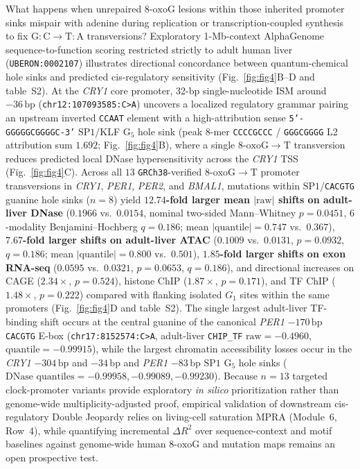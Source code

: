 \documentclass[10pt,letterpaper]{article}
\theoremstyle{plain}
\theoremstyle{definition}
\newcommand{\oxog}{\text{8-oxoG}}
\begin{document}
What happens when unrepaired $\oxog$ lesions within those inherited promoter sinks mispair with adenine during replication or transcription-coupled synthesis to fix $\mathrm{G{:}C \to T{:}A}$ transversions? Exploratory 1-Mb-context AlphaGenome sequence-to-function scoring restricted strictly to adult human liver (\texttt{UBERON:0002107}) illustrates directional concordance between quantum-chemical hole sinks and predicted cis-regulatory sensitivity (Fig.~\ref{fig:fig4}B--D and table~S2). At the \emph{CRY1} core promoter, 32-bp single-nucleotide ISM around $-36\,\mathrm{bp}$ (\texttt{chr12:107093585:C>A}) uncovers a localized regulatory grammar pairing an upstream inverted \texttt{CCAAT} element with a high-attribution sense \texttt{5'-GGGGGCGGGGC-3'} $\mathrm{SP1}$/KLF $\mathrm{G}_5$ hole sink (peak 8-mer \texttt{CCCCGCCC} / \texttt{GGGCGGGG} L2 attribution sum $1.692$; Fig.~\ref{fig:fig4}B), where a single $\oxog \to \mathrm{T}$ transversion reduces predicted local DNase hypersensitivity across the \emph{CRY1} TSS (Fig.~\ref{fig:fig4}C). Across all $13$ \texttt{GRCh38}-verified $\oxog \to \mathrm{T}$ promoter transversions in \emph{CRY1}, \emph{PER1}, \emph{PER2}, and \emph{BMAL1}, mutations within $\mathrm{SP1}$/\texttt{CACGTG} guanine hole sinks ($n=8$) yield \textbf{$12.74$-fold larger mean $|\text{raw}|$ shifts on adult-liver DNase} ($0.1966$ vs.\ $0.0154$, nominal two-sided Mann--Whitney $p = 0.0451$, $6$-modality Benjamini--Hochberg $q = 0.186$; mean $|\text{quantile}| = 0.747$ vs.\ $0.367$), \textbf{$7.67$-fold larger shifts on adult-liver ATAC} ($0.1009$ vs.\ $0.0131$, $p = 0.0932$, $q = 0.186$; mean $|\text{quantile}| = 0.800$ vs.\ $0.501$), \textbf{$1.85$-fold larger shifts on exon RNA-seq} ($0.0595$ vs.\ $0.0321$, $p = 0.0653$, $q = 0.186$), and directional increases on CAGE ($2.34\times$, $p = 0.524$), histone ChIP ($1.87\times$, $p = 0.171$), and TF ChIP ($1.48\times$, $p = 0.222$) compared with flanking isolated $G_1$ sites within the same promoters (Fig.~\ref{fig:fig4}D and table~S2). The single largest adult-liver TF-binding shift occurs at the central guanine of the canonical \emph{PER1} $-170\,\mathrm{bp}$ \texttt{CACGTG} E-box (\texttt{chr17:8152574:C>A}, adult-liver \texttt{CHIP\_TF} $\text{raw} = -0.4960$, $\text{quantile} = -0.99915$), while the largest chromatin accessibility losses occur in the \emph{CRY1} $-304\,\mathrm{bp}$ and $-34\,\mathrm{bp}$ and \emph{PER1} $-83\,\mathrm{bp}$ $\mathrm{SP1}$ $\mathrm{G}_5$ hole sinks ($\text{DNase quantiles} = -0.99958, -0.99089, -0.99230$). Because $n = 13$ targeted clock-promoter variants provide exploratory \emph{in silico} prioritization rather than genome-wide multiplicity-adjusted proof, empirical validation of downstream cis-regulatory Double Jeopardy relies on living-cell saturation MPRA (Module~6, Row~4), while quantifying incremental $\Delta R^2$ over sequence-context and motif baselines against genome-wide human $\oxog$ and mutation maps remains an open prospective test.
\end{document}
